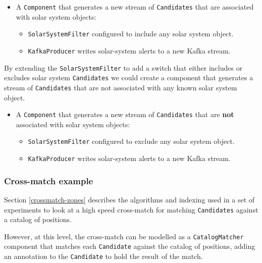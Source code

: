 \documentclass{article}
\newcommand{\kafka} {Kafka\xspace}
\newcommand{\crossmatch} {cross-match\xspace}
\begin{document}
\begin{itemize}
    \item A \texttt{Component} that generates a new stream of \texttt{Candidates} that are associated with solar system objects:
    \begin{itemize}
        \item \texttt{SolarSystemFilter} configured to include any solar system object.
    \end{itemize}
    \begin{itemize}
        \item \texttt{KafkaProducer} writes solar-system alerts to a new \kafka stream.
    \end{itemize}
\end{itemize}

By extending the \texttt{SolarSystemFilter} to add a switch that either includes or excludes solar system \texttt{Candidates} we could create a component that generates a stream of \texttt{Candidates} that are not associated with any known solar system object.

\begin{itemize}
    \item A \texttt{Component} that generates a new stream of \texttt{Candidates} that are \textbf{not} associated with solar system objects:
    \begin{itemize}
        \item \texttt{SolarSystemFilter} configured to exclude any solar system object.
    \end{itemize}
    \begin{itemize}
        \item \texttt{KafkaProducer} writes solar-system alerts to a new \kafka stream.
    \end{itemize}
\end{itemize}

\subsubsection{Cross-match example}
\label{workflow.cross-match}

Section \ref{crossmatch-zones} describes the algorithms and indexing used in a set of experiments to look at a high speed \crossmatch for matching \texttt{Candidates} against a catalog of positions.

However, at this level, the \crossmatch can be modelled as a \texttt{CatalogMatcher} component that matches each \texttt{Candidate} against the catalog of positions, adding an annotation to the \texttt{Candidate} to hold the result of the match.
\end{document}
